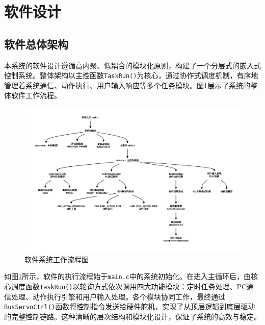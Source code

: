 \documentclass[a4paper,fontset=windows]{ctexart}
\begin{document}
\section{软件设计}
\subsection{软件总体架构}
本系统的软件设计遵循高内聚、低耦合的模块化原则，构建了一个分层式的嵌入式控制系统。整体架构以主控函数\texttt{TaskRun()}为核心，通过协作式调度机制，有序地管理着系统通信、动作执行、用户输入响应等多个任务模块。图\ref{fig:software_arch}展示了系统的整体软件工作流程。

\begin{figure}[H]
    \centering
    \includegraphics[width=1.0\textwidth]{software_flowchart.png}
    \caption{软件系统工作流程图}
    \label{fig:software_arch}
\end{figure}

如图\ref{fig:software_arch}所示，软件的执行流程始于\texttt{main.c}中的系统初始化。在进入主循环后，由核心调度函数\texttt{TaskRun()}以轮询方式依次调用四大功能模块：定时任务处理、PC通信处理、动作执行引擎和用户输入处理。各个模块协同工作，最终通过\texttt{BusServoCtrl()}函数将控制指令发送给硬件舵机，实现了从顶层逻辑到底层驱动的完整控制链路。这种清晰的层次结构和模块化设计，保证了系统的高效与稳定。
\end{document}
